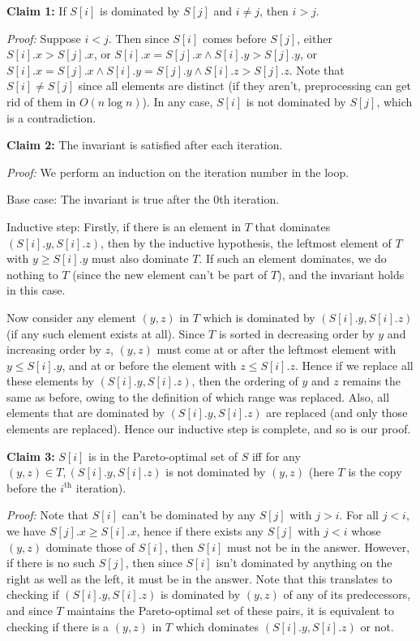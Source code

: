 \documentclass[answers]{exam}
\begin{document}
\begin{questions}
\begin{solution}
    \textbf{Claim 1:} If $S[i]$ is dominated by $S[j]$ and $i \ne j$, then $i > j$.

    \textit{Proof:} Suppose $i < j$. Then since $S[i]$ comes before $S[j]$, either $S[i].x > S[j].x$, or $S[i].x = S[j].x \land S[i].y > S[j].y$, or $S[i].x = S[j].x \land S[i].y = S[j].y \land
    S[i].z > S[j].z$. Note that $S[i] \ne S[j]$ since all elements are distinct (if they aren't, preprocessing can get rid of them in $O(n \log n)$). In any case, $S[i]$ is not dominated by $S[j]$,
    which is a contradiction.

    \textbf{Claim 2:} The invariant is satisfied after each iteration.
    
    \textit{Proof:} We perform an induction on the iteration number in the loop.

    Base case: The invariant is true after the 0th iteration.
    
    Inductive step: Firstly, if there is an element in $T$ that dominates $(S[i].y, S[i].z)$, then by the inductive hypothesis, the leftmost element of $T$ with $y \ge S[i].y$ must also
    dominate $T$. If such an element dominates, we do nothing to $T$ (since the new element can't be part of $T$), and the invariant holds in this case.

    Now consider any element $(y, z)$ in $T$ which is dominated by $(S[i].y, S[i].z)$ (if any such element exists at all). Since $T$ is sorted in decreasing order by $y$ and increasing order by $z$,
    $(y, z)$ must come at or after the leftmost element with $y \le S[i].y$, and at or before the element with $z \le S[i].z$. Hence if we replace all these elements by $(S[i].y, S[i].z)$, then the ordering of $y$ and $z$ remains the same as before, owing to the definition of which
    range was replaced. Also, all elements that are dominated by $(S[i].y, S[i].z)$ are replaced (and only those elements are replaced).
    Hence our inductive step is complete, and so is our proof.

    \textbf{Claim 3:} $S[i]$ is in the Pareto-optimal set of $S$ iff for any $(y, z) \in T, (S[i].y, S[i].z)$ is not dominated by $(y, z)$ (here $T$ is the copy before the $i^\mathrm{th}$
    iteration).
    
    \textit{Proof:} Note that $S[i]$ can't be dominated by any $S[j]$ with $j > i$. For all $j < i$, we have $S[j].x \ge S[i].x$, hence if there exists any $S[j]$ with $j < i$ whose $(y, z)$ dominate
    those of $S[i]$, then $S[i]$ must not be in the answer. However, if there is no such $S[j]$, then since $S[i]$ isn't dominated by anything on the right as well as the left, it must be in the
    answer. Note that this translates to checking if $(S[i].y, S[i].z)$ is dominated by $(y, z)$ of any of its predecessors, and since $T$ maintains the Pareto-optimal set of these pairs, it is
    equivalent to checking if there is a $(y, z)$ in $T$ which dominates $(S[i].y, S[i].z)$ or not.


\end{solution}
\end{questions}
\end{document}
